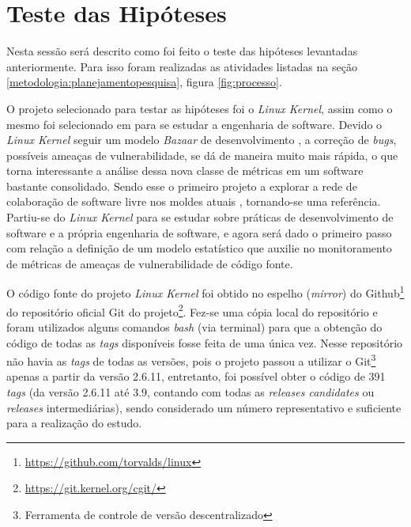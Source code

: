 \section{Teste das Hipóteses}\label{metodologia:testehipoteses}

Nesta sessão será descrito como foi feito o teste das hipóteses levantadas
anteriormente. Para isso foram realizadas as atividades listadas na seção
\ref{metodologia:planejamentopesquisa}, figura \ref{fig:processo}.

O projeto selecionado para testar as hipóteses foi o \textit{Linux Kernel},
assim como o mesmo foi selecionado em  para se
estudar a engenharia de software. Devido o \textit{Linux Kernel} seguir um
modelo \textit{Bazaar} de desenvolvimento \cite{cathedral_bazaar:1997}, a
correção de \textit{bugs}, possíveis ameaças de vulnerabilidade, se dá de
maneira muito mais rápida, o que torna interessante a análise dessa nova classe
de métricas em um software bastante consolidado. Sendo esse o primeiro projeto a
explorar a rede de colaboração de software livre nos moldes atuais
\cite{cathedral_bazaar:1997}, tornando-se uma referência. Partiu-se do
\textit{Linux Kernel} para se estudar sobre práticas de desenvolvimento de
software e a própria engenharia de software, e agora será dado o primeiro passo
com relação a definição de um modelo estatístico que auxilie no monitoramento de
métricas de ameaças de vulnerabilidade de código fonte.

O código fonte do projeto \textit{Linux Kernel} foi obtido no espelho
(\textit{mirror}) do Github\footnote{\url{https://github.com/torvalds/linux}}
do repositório oficial Git do
projeto\footnote{\url{https://git.kernel.org/cgit/}}.  Fez-se uma cópia local
do repositório e foram utilizados alguns comandos \textit{bash} (via terminal)
para que a obtenção do código de todas as \textit{tags} disponíveis fosse feita
de uma única vez. Nesse repositório não havia as \textit{tags} de todas as
versões, pois o projeto passou a utilizar o Git\footnote{Ferramenta de controle
de versão descentralizado} apenas a partir da versão 2.6.11, entretanto, foi
possível obter o código de 391 \textit{tags} (da versão 2.6.11 até 3.9, contando
com todas as \textit{releases candidates} ou \textit{releases} intermediárias),
sendo considerado um número representativo e suficiente para a realização do
estudo.

